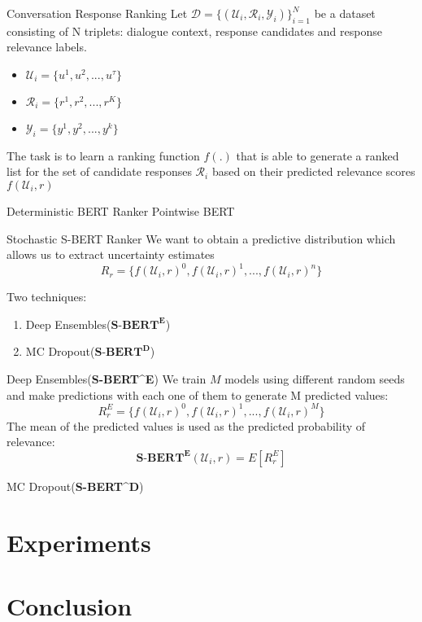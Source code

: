 \documentclass{beamer}
\begin{document}
\begin{frame}{Conversation Response Ranking}
Let $\mathcal{D} = \{(\mathcal{U}_i, \mathcal{R}_i, \mathcal{Y}_i) \}_{i=1}^N $ be a dataset consisting of N triplets: dialogue context, response candidates and response relevance labels.
\begin{itemize}
    \item $\mathcal{U}_i = \{u^1, u^2, ..., u^{\tau}\}$
    \item $\mathcal{R}_i = \{r^1, r^2, ..., r^K \}$
    \item $\mathcal{Y}_i = \{y^1, y^2, ..., y^k \}$
\end{itemize}
The task is to learn a ranking function $f(.)$ that is able to generate a
ranked list for the set of candidate responses $\mathcal{R}_i$
based on their predicted relevance scores $f(\mathcal{U}_i, r)$
\end{frame}

\begin{frame}{Deterministic BERT Ranker}
Pointwise BERT
    
\end{frame}

\begin{frame}{Stochastic S-BERT Ranker}
We want to obtain a predictive distribution which allows us to extract uncertainty estimates
\begin{equation}
    R_r = \{ f(\mathcal{U}_i, r)^0, f(\mathcal{U}_i, r)^1, ..., f(\mathcal{U}_i, r)^n \}
\end{equation}
    
Two techniques:
\begin{enumerate}
    \item Deep Ensembles($\textbf{S-BERT}^\textbf{E}$)
    
    \item MC Dropout($\textbf{S-BERT}^\textbf{D}$)
\end{enumerate}

\end{frame}

\begin{frame}{Deep Ensembles(\textbf{S-BERT}^{\textbf{E}})}
We train $M$ models using different random seeds and make predictions with each one of them to generate M predicted values:
\begin{equation}
    R^{E}_{r} = \{ f(\mathcal{U}_i, r)^0, f(\mathcal{U}_i, r)^1, ..., f(\mathcal{U}_i, r)^M \}
\end{equation}
The mean of the predicted values is used as the predicted probability of relevance:
\begin{equation}
    \textbf{S-BERT}^{\textbf{E}}(\mathcal{U}_i, r) = E[R^E_r]
\end{equation}
    
\end{frame}

\begin{frame}{MC Dropout(\textbf{S-BERT}^{\textbf{D}})}
    
\end{frame}

\section{Experiments}

\section{Conclusion}



\end{document}
